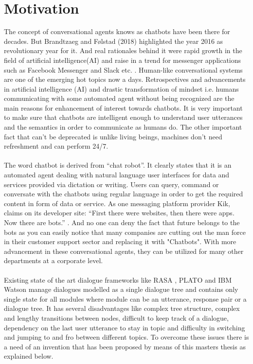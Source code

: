 \section{Motivation}
The concept of conversational agents knows as chatbots have been there for decades. But Brandtzaeg and Følstad (2018) highlighted the year 2016 as revolutionary year for it. And real rationales behind it were rapid growth in the field of artificial intelligence(AI) and raise in a trend for messenger applications such as Facebook Messenger and Slack etc. \cite{ChatbotsChangingUserNeedsMotivations}. Human-like conversational systems are one of  the  emerging  hot  topics  now  a  days.   Retrospectives  and  advancements  in  artificial intelligence (AI) and drastic transformation of mindset i.e.  humans communicating with some automated agent without being recognized are the main reasons for enhancement of interest towards chatbots.  It is very important to make sure that chatbots are intelligent enough to understand user utterances and the semantics in order to communicate as humans do.  The other important fact that can’t be deprecated is unlike living beings, machines don’t need refreshment and can perform 24/7.
\\~\\
The word chatbot is derived from “chat robot”. It  clearly  states  that  it  is  an  automated agent dealing with natural language user interfaces for data and services provided via dictation or writing. Users can query, command or conversate with the chatbots using regular language in order to get the required content in form of data or service.  As one messaging platform provider Kik, claims on its developer site:  “First there were websites, then there were apps.  Now there are bots.” \cite{ChatbotsChangingUserNeedsMotivations}. And no one can deny the fact that future belongs to the bots as you can easily notice that many companies are cutting out the man force in their customer support sector and replacing it with "Chatbots". With more advancement in these conversational agents, they can be utilized for many other departments at a corporate level.
\\~\\
Existing state of the art dialogue frameworks like RASA \cite{rasa}, PLATO \cite{plato} and IBM Watson \cite{ibmwatson} manage dialogues modelled as a single dialogue tree and contains only single state for all modules where module can be an utterance, response pair or a dialogue tree. It has several disadvantages like complex tree structure, complex and lengthy transitions between nodes, difficult to keep track of a dialogue, dependency on the last user utterance to stay in topic and difficulty in switching and jumping to and fro between different topics. To overcome these issues there is a need of an invention that has been proposed by means of this masters thesis as explained below.

